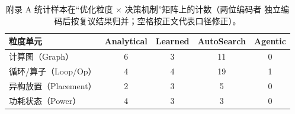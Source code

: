 \begin{table}[t]
  \centering
  \caption{附录 A 统计样本在“优化粒度 $\times$ 决策机制”矩阵上的计数（两位编码者
    独立编码后按复议结果归并；空格按正文代表口径修正）。}
  \label{tab:matrix-counts}
  \small
  \begin{tabular}{lcccc}
    \toprule
    粒度单元 & Analytical & Learned & AutoSearch & Agentic \\
    \midrule
    计算图（Graph）   & 6 & 3 & 11 & 0 \\
    循环/算子（Loop/Op） & 4 & 4 & 19 & 1 \\
    异构放置（Placement） & 2 & 3 & 5 & 0 \\
    功耗状态（Power） & 4 & 3 & 3 & 0 \\
    \bottomrule
  \end{tabular}
\end{table}
